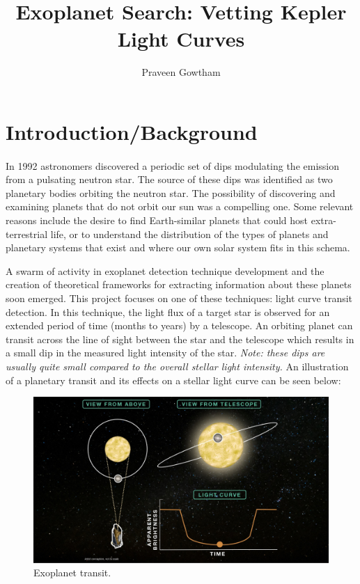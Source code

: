 \documentclass{article}
\begin{document}
\title{Exoplanet Search: Vetting Kepler Light Curves}
\author{Praveen Gowtham}
\date{}
\maketitle
\section{Introduction/Background}
\paragraph{}
In 1992 astronomers discovered a periodic set of dips modulating the emission from a pulsating neutron star. The source of these dips was identified as two planetary bodies orbiting the neutron star. The possibility of discovering and examining planets that do not orbit our sun was a compelling one. Some relevant reasons include the desire to find Earth-similar planets that could host extra-terrestrial life, or to understand the distribution of the types of planets and planetary systems that exist and where our own solar system fits in this schema.

 A swarm of activity in exoplanet detection technique development and the creation of theoretical frameworks for extracting information about these planets soon emerged. This project focuses on one of these techniques: light curve transit detection. In this technique, the light flux of a target star is observed for an extended period of time (months to years) by a telescope. An orbiting planet can transit across the line of sight between the star and the telescope which results in a small dip in the measured light intensity of the star. \textit{Note: these dips are usually quite small compared to the overall stellar light intensity.} An illustration of a planetary transit and its effects on a stellar light curve can be seen below:
 
 \begin{figure}[H]
 	\begin{center}
 		\includegraphics[totalheight=5cm]{figures/transit_illustration.jpg}
 	\end{center}
 \caption{Exoplanet transit.}
 \end{figure}
\end{document}
